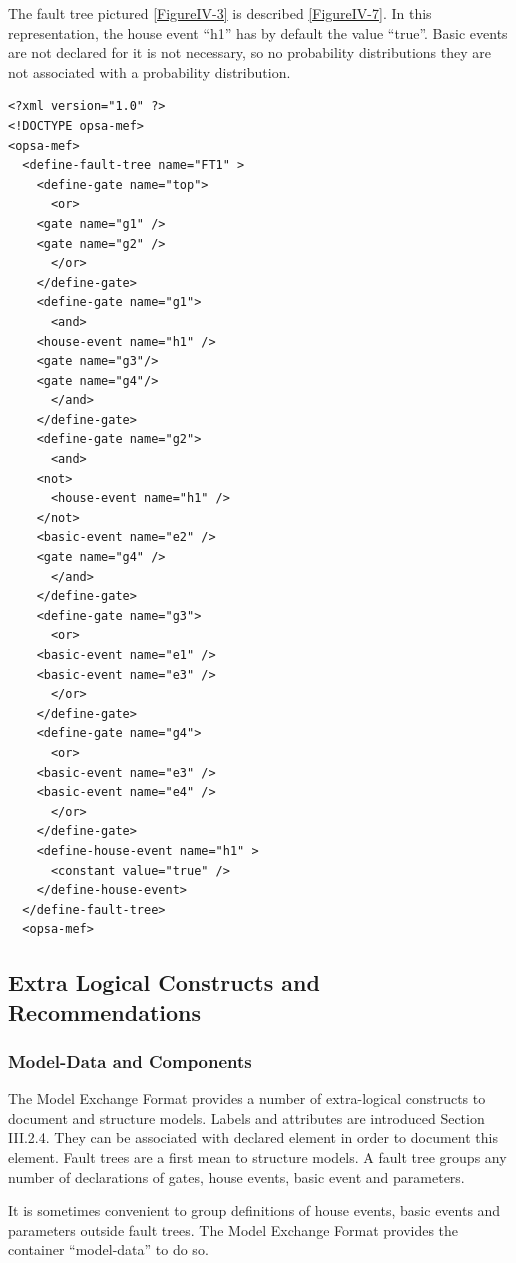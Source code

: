 \documentclass[11pt]{article}
\begin{document}
The fault tree pictured \ref{FigureIV-3} is described \ref{FigureIV-7}. In this
representation, the house event ``h1'' has by default the value ``true''.
Basic events are not declared for it is not necessary, so no probability
distributions they are not associated with a probability distribution.

\begin{lstlisting}
<?xml version="1.0" ?>
<!DOCTYPE opsa-mef>
<opsa-mef>
  <define-fault-tree name="FT1" >
    <define-gate name="top">
      <or>
	<gate name="g1" />
	<gate name="g2" />
      </or>
    </define-gate>
    <define-gate name="g1">
      <and>
	<house-event name="h1" />
	<gate name="g3"/>
	<gate name="g4"/>
      </and>
    </define-gate>
    <define-gate name="g2">
      <and>
	<not>
	  <house-event name="h1" />
	</not>
	<basic-event name="e2" />
	<gate name="g4" />
      </and>
    </define-gate>
    <define-gate name="g3">
      <or>
	<basic-event name="e1" />
	<basic-event name="e3" />
      </or>
    </define-gate>
    <define-gate name="g4">
      <or>
	<basic-event name="e3" />
	<basic-event name="e4" />
      </or>
    </define-gate>
    <define-house-event name="h1" >
      <constant value="true" />
    </define-house-event>
  </define-fault-tree>
  <opsa-mef>
\end{lstlisting}



\subsection{Extra Logical Constructs and Recommendations}
\label{sec:org919658d}


\subsubsection{Model-Data and Components}
\label{sec:org46ba0cc}

The Model Exchange Format provides a number of extra-logical constructs
to document and structure models. Labels and attributes are introduced
Section III.2.4. They can be associated with declared element in order
to document this element. Fault trees are a first mean to structure
models. A fault tree groups any number of declarations of gates, house
events, basic event and parameters.

It is sometimes convenient to group definitions of house events, basic
events and parameters outside fault trees. The Model Exchange Format
provides the container ``model-data'' to do so.
\end{document}
